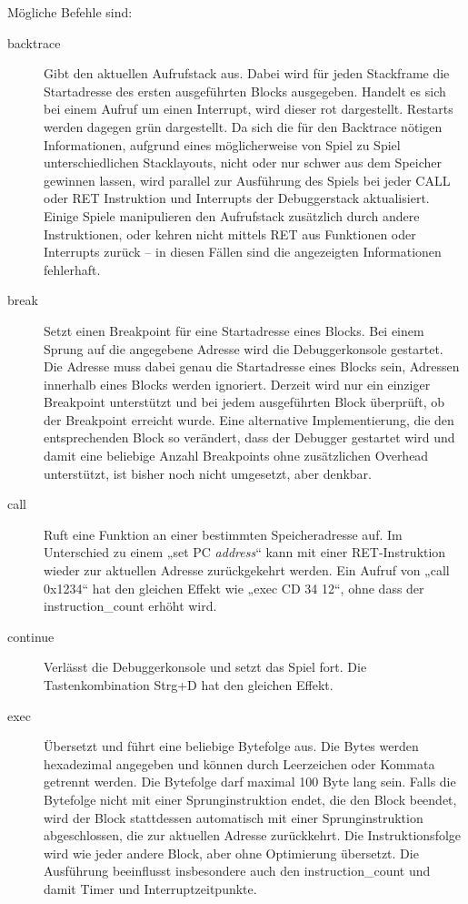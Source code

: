 \documentclass[a4paper]{scrartcl}
\begin{document}
Mögliche Befehle sind:
\begin{description}
\item[backtrace] Gibt den aktuellen Aufrufstack aus. Dabei wird für jeden Stackframe die Startadresse des ersten ausgeführten Blocks ausgegeben. Handelt es sich bei einem Aufruf um einen Interrupt, wird dieser rot dargestellt. Restarts werden dagegen grün dargestellt. Da sich die für den Backtrace nötigen Informationen, aufgrund eines möglicherweise von Spiel zu Spiel unterschiedlichen Stacklayouts, nicht oder nur schwer aus dem Speicher gewinnen lassen, wird parallel zur Ausführung des Spiels bei jeder CALL oder RET Instruktion und Interrupts der Debuggerstack aktualisiert. Einige Spiele manipulieren den Aufrufstack zusätzlich durch andere Instruktionen, oder kehren nicht mittels RET aus Funktionen oder Interrupts zurück -- in diesen Fällen sind die angezeigten Informationen fehlerhaft.
\item[break] Setzt einen Breakpoint für eine Startadresse eines Blocks. Bei einem Sprung auf die angegebene Adresse wird die Debuggerkonsole gestartet. Die Adresse muss dabei genau die Startadresse eines Blocks sein, Adressen innerhalb eines Blocks werden ignoriert. Derzeit wird nur ein einziger Breakpoint unterstützt und bei jedem ausgeführten Block überprüft, ob der Breakpoint erreicht wurde. Eine alternative Implementierung, die den entsprechenden Block so verändert, dass der Debugger gestartet wird und damit eine beliebige Anzahl Breakpoints ohne zusätzlichen Overhead unterstützt, ist bisher noch nicht umgesetzt, aber denkbar.
\item[call] Ruft eine Funktion an einer bestimmten Speicheradresse auf. Im Unterschied zu einem „set PC \emph{address}“ kann mit einer RET-Instruktion wieder zur aktuellen Adresse zurückgekehrt werden. Ein Aufruf von „call 0x1234“ hat den gleichen Effekt wie „exec CD 34 12“, ohne dass der instruction\_count erhöht wird.
\item[continue] Verlässt die Debuggerkonsole und setzt das Spiel fort. Die Tastenkombination Strg+D hat den gleichen Effekt.
\item[exec] Übersetzt und führt eine beliebige Bytefolge aus. Die Bytes werden hexadezimal angegeben und können durch Leerzeichen oder Kommata getrennt werden. Die Bytefolge darf maximal 100 Byte lang sein. Falls die Bytefolge nicht mit einer Sprunginstruktion endet, die den Block beendet, wird der Block stattdessen automatisch mit einer Sprunginstruktion abgeschlossen, die zur aktuellen Adresse zurückkehrt. Die Instruktionsfolge wird wie jeder andere Block, aber ohne Optimierung übersetzt. Die Ausführung beeinflusst insbesondere auch den instruction\_count und damit Timer und Interruptzeitpunkte.

\end{description}
\end{document}
